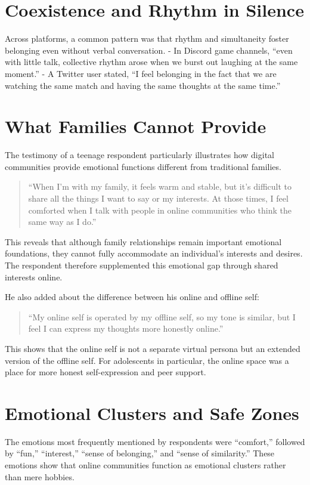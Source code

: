 \section{Coexistence and Rhythm in Silence}
Across platforms, a common pattern was that rhythm and simultaneity foster belonging even without verbal conversation.  
- In Discord game channels, “even with little talk, collective rhythm arose when we burst out laughing at the same moment.”  
- A Twitter user stated, “I feel belonging in the fact that we are watching the same match and having the same thoughts at the same time.”  


\section{What Families Cannot Provide}
The testimony of a teenage respondent particularly illustrates how digital communities provide emotional functions different from traditional families.  

\begin{quote}
“When I’m with my family, it feels warm and stable, but it’s difficult to share all the things I want to say or my interests. At those times, I feel comforted when I talk with people in online communities who think the same way as I do.”
\end{quote}

This reveals that although family relationships remain important emotional foundations, they cannot fully accommodate an individual’s interests and desires. The respondent therefore supplemented this emotional gap through shared interests online.  

He also added about the difference between his online and offline self:  

\begin{quote}
“My online self is operated by my offline self, so my tone is similar, but I feel I can express my thoughts more honestly online.”
\end{quote}

This shows that the online self is not a separate virtual persona but an extended version of the offline self. For adolescents in particular, the online space was a place for more honest self-expression and peer support.  

\section{Emotional Clusters and Safe Zones}
The emotions most frequently mentioned by respondents were “comfort,” followed by “fun,” “interest,” “sense of belonging,” and “sense of similarity.” These emotions show that online communities function as emotional clusters rather than mere hobbies.  

